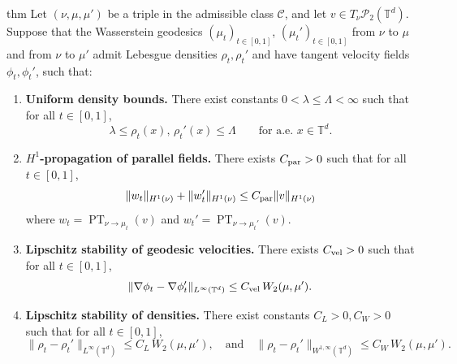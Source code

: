\documentclass[11pt]{article}
\newcommand{\PT}{\operatorname{PT}}
\begin{document}
\begin{restatable}{thm}{} \label{wpt stability}
Let $(\nu,\mu,\mu')$ be a triple in the admissible class $\mathcal C$, and let $v \in T_\nu\mathcal{P}_2(\mathbb{T}^d)$. Suppose that the Wasserstein geodesics $(\mu_t)_{t\in[0,1]}$, $ (\mu_t')_{t\in[0,1]}$ from $\nu$ to $\mu$ and from $\nu$ to $\mu'$ admit Lebesgue densities $\rho_t,\rho_t'$ and have tangent velocity fields $\phi_t,\phi_t'$, such that:

\begin{enumerate}
    \item \textbf{Uniform density bounds.} There exist constants $0<\lambda\le \Lambda<\infty$ such that for all $t\in[0,1]$,
    \[
    \lambda \le \rho_t(x),\,\rho_t'(x)\le \Lambda
    \qquad\text{for a.e. }x\in\mathbb{T}^d.
    \]
    
    \item \textbf{$H^1$-propagation of parallel fields.} There exists $C_{\rm par}>0$ such that for all $t\in[0,1]$,
    \[
    \|w_t\|_{H^1(\nu)}+\|w_t'\|_{H^1(\nu)}
    \le C_{\rm par}\|v\|_{H^1(\nu)}
    \]
    where $w_t = {\PT}_{\nu \rightarrow \mu_t}(v)$ and $w_t' = {\PT}_{\nu \rightarrow \mu_t'}(v)$.

    \item \textbf{Lipschitz stability of geodesic velocities.} There exists $C_{\rm vel}>0$ such that for all $t\in[0,1]$,
    \[
    \|\nabla\phi_t-\nabla\phi_t'\|_{L^\infty(\mathbb{T}^d)}
    \le C_{\rm vel}\,W_2(\mu,\mu').
    \]

    \item \textbf{Lipschitz stability of densities.} There exist constants $C_{L}>0, C_W > 0$ such that for all $t\in[0,1]$,
    \[
    \|\rho_t-\rho_t'\|_{L^\infty(\mathbb{T}^d)}
    \le C_{L}\,W_2(\mu,\mu'), \quad \text{and} \quad \|\rho_t-\rho_t'\|_{W^{1,\infty}(\mathbb{T}^d)}
    \le C_{W}\,W_2(\mu,\mu').
    \]


\end{enumerate}
\end{restatable}
\end{document}
